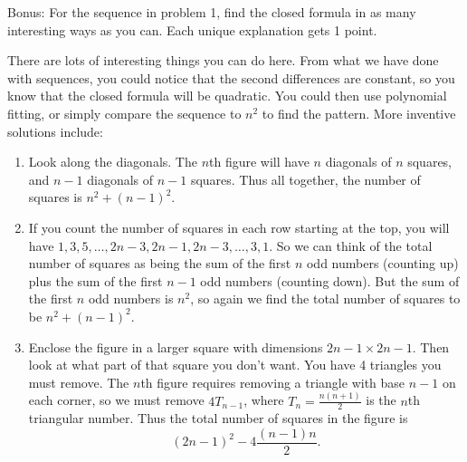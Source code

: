 \begin{questions}

\question[4] Bonus: For the sequence in problem 1, find the closed formula in as many interesting ways as you can.  Each unique explanation gets 1 point.

\begin{solution}
  There are lots of interesting things you can do here.  From what we have done with sequences, you could notice that the second differences are constant, so you know that the closed formula will be quadratic.  You could then use polynomial fitting, or simply compare the sequence to $n^2$ to find the pattern.  More inventive solutions include:
  \begin{enumerate}
    \item Look along the diagonals.  The $n$th figure will have $n$ diagonals of $n$ squares, and $n-1$ diagonals of $n-1$ squares.  Thus all together, the number of squares is $n^2 + (n-1)^2$.
    \item If you count the number of squares in each row starting at the top, you will have $1, 3, 5, \ldots, 2n-3, 2n-1, 2n-3, \ldots, 3, 1$.  So we can think of the total number of squares as being the sum of the first $n$ odd numbers (counting up) plus the sum of the first $n-1$ odd numbers (counting down).  But the sum of the first $n$ odd numbers is $n^2$, so again we find the total number of squares to be $n^2 + (n-1)^2$.
    \item Enclose the figure in a larger square with dimensions $2n-1 \times 2n-1$.  Then look at what part of that square you don't want.  You have 4 triangles you must remove.  The $n$th figure requires removing a triangle with base $n-1$ on each corner, so we must remove $4T_{n-1}$, where $T_n = \frac{n(n+1)}{2}$ is the $n$th triangular number.  Thus the total number of squares in the figure is
    \[(2n-1)^2 - 4\frac{(n-1)n}{2}.\]
  \end{enumerate}
\end{solution}


\end{questions}


